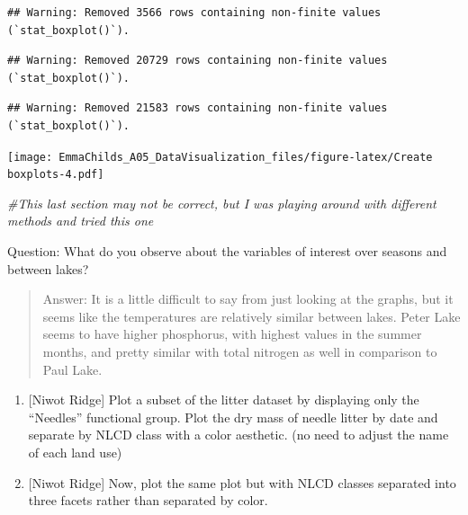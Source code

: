 \documentclass[
]{article}
\newenvironment{Shaded}{\begin{snugshade}}{\end{snugshade}}
\newcommand{\CommentTok}[1]{\textcolor[rgb]{0.56,0.35,0.01}{\textit{#1}}}
\begin{document}
\begin{verbatim}
## Warning: Removed 3566 rows containing non-finite values (`stat_boxplot()`).
\end{verbatim}

\begin{verbatim}
## Warning: Removed 20729 rows containing non-finite values (`stat_boxplot()`).
\end{verbatim}

\begin{verbatim}
## Warning: Removed 21583 rows containing non-finite values (`stat_boxplot()`).
\end{verbatim}

\texttt{[image: EmmaChilds\_A05\_DataVisualization\_files/figure-latex/Create boxplots-4.pdf]}

\begin{Shaded}
\begin{Highlighting}[]
\CommentTok{\#This last section may not be correct, but I was playing around with different methods and tried this one}
\end{Highlighting}
\end{Shaded}

Question: What do you observe about the variables of interest over
seasons and between lakes?

\begin{quote}
Answer: It is a little difficult to say from just looking at the graphs,
but it seems like the temperatures are relatively similar between lakes.
Peter Lake seems to have higher phosphorus, with highest values in the
summer months, and pretty similar with total nitrogen as well in
comparison to Paul Lake.
\end{quote}

\begin{enumerate}
\def\labelenumi{\arabic{enumi}.}
\setcounter{enumi}{5}
\item
  {[}Niwot Ridge{]} Plot a subset of the litter dataset by displaying
  only the ``Needles'' functional group. Plot the dry mass of needle
  litter by date and separate by NLCD class with a color aesthetic. (no
  need to adjust the name of each land use)
\item
  {[}Niwot Ridge{]} Now, plot the same plot but with NLCD classes
  separated into three facets rather than separated by color.
\end{enumerate}
\end{document}
